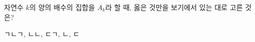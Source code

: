자연수 $k$의 양의 배수의 집합을 $A_k$라 할 때, 옳은 것만을 보기에서 있는 대로 고른 것은? 
\begin{choices32}{ㄱ}{ㄴ}{ㄱ, ㄴ}{ㄴ, ㄷ}{ㄱ, ㄴ, ㄷ}\end{choices32}
